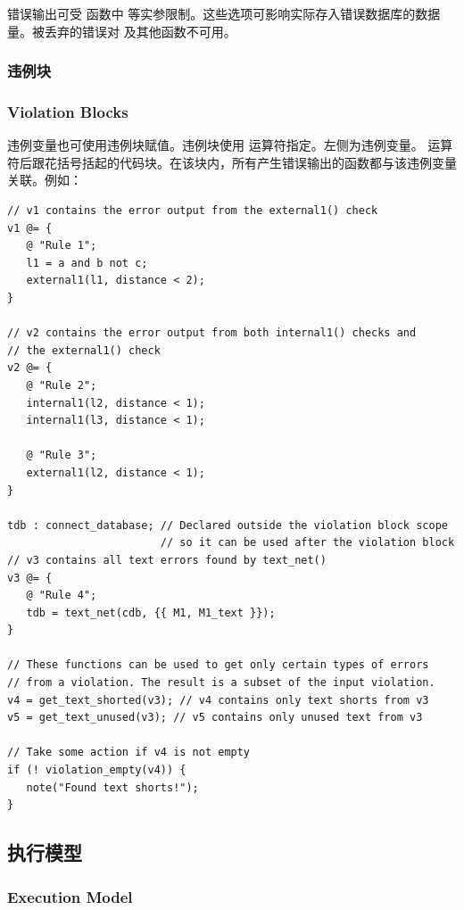 \begin{noteBox}
错误输出可受  函数中  等实参限制。这些选项可影响实际存入错误数据库的数据量。被丢弃的错误对  及其他函数不可用。
\end{noteBox}

\subsubsection{违例块}
\subsubsection*{Violation Blocks}

违例变量也可使用违例块赋值。违例块使用  运算符指定。左侧为违例变量。 运算符后跟花括号括起的代码块。在该块内，所有产生错误输出的函数都与该违例变量关联。例如：
\begin{lstlisting}[style=pxl]
// v1 contains the error output from the external1() check
v1 @= {
   @ "Rule 1";
   l1 = a and b not c;
   external1(l1, distance < 2);
}

// v2 contains the error output from both internal1() checks and
// the external1() check
v2 @= {
   @ "Rule 2";
   internal1(l2, distance < 1);
   internal1(l3, distance < 1);

   @ "Rule 3";
   external1(l2, distance < 1);
}

tdb : connect_database; // Declared outside the violation block scope
                        // so it can be used after the violation block
// v3 contains all text errors found by text_net()
v3 @= {
   @ "Rule 4";
   tdb = text_net(cdb, {{ M1, M1_text }});
}

// These functions can be used to get only certain types of errors
// from a violation. The result is a subset of the input violation.
v4 = get_text_shorted(v3); // v4 contains only text shorts from v3
v5 = get_text_unused(v3); // v5 contains only unused text from v3

// Take some action if v4 is not empty
if (! violation_empty(v4)) {
   note("Found text shorts!");
}
\end{lstlisting}

\subsection{执行模型}
\subsubsection*{Execution Model}

